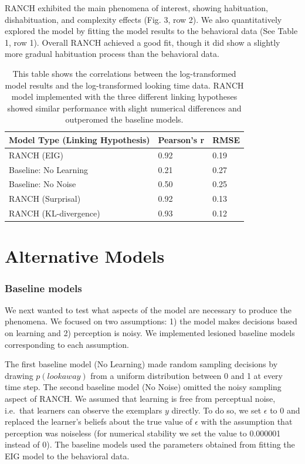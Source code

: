 \documentclass[10pt, letterpaper]{article}
\begin{document}
RANCH exhibited the main phenomena of interest, showing habituation,
dishabituation, and complexity effects (Fig. 3, row 2). We also
quantitatively explored the model by fitting the model results to the
behavioral data (See Table 1, row 1). Overall RANCH achieved a good fit,
though it did show a slightly more gradual habituation process than the
behavioral data.

\begin{table}[ht]
\centering
\begin{tabular}{lll}
  \hline
Model Type (Linking Hypothesis) & Pearson's r & RMSE \\ 
  \hline
RANCH (EIG) & 0.92 & 0.19 \\ 
  Baseline: No Learning & 0.21 & 0.27 \\ 
  Baseline: No Noise & 0.50 & 0.25 \\ 
  RANCH (Surprisal) & 0.92 & 0.13 \\ 
  RANCH (KL-divergence) & 0.93 & 0.12 \\ 
   \hline
\end{tabular}
\caption{This table shows the correlations between the log-transformed model results and the log-transformed looking time data. RANCH model implemented with the three different linking hypotheses showed similar performance with slight numerical differences and outperomed the baseline models.} 
\end{table}

\hypertarget{alternative-models}{%
\section{Alternative Models}\label{alternative-models}}

\hypertarget{baseline-models}{%
\subsubsection{Baseline models}\label{baseline-models}}

We next wanted to test what aspects of the model are necessary to
produce the phenomena. We focused on two assumptions: 1) the model makes
decisions based on learning and 2) perception is noisy. We implemented
lesioned baseline models corresponding to each assumption.

The first baseline model (No Learning) made random sampling decisions by
drawing \(p(look away)\) from a uniform distribution between 0 and 1 at
every time step. The second baseline model (No Noise) omitted the noisy
sampling aspect of RANCH. We assumed that learning is free from
perceptual noise, i.e.~that learners can observe the exemplars \(y\)
directly. To do so, we set \(\epsilon\) to 0 and replaced the learner's
beliefs about the true value of \(\epsilon\) with the assumption that
perception was noiseless (for numerical stability we set the value to
0.000001 instead of 0). The baseline models used the parameters obtained
from fitting the EIG model to the behavioral data.
\end{document}
